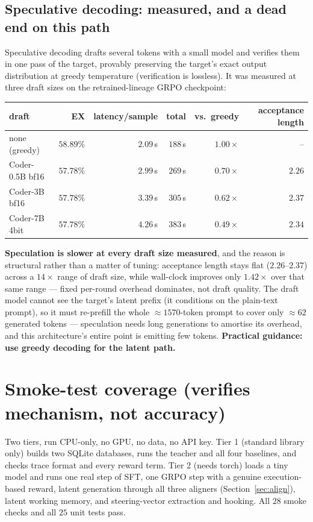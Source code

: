 \documentclass[11pt]{article}
\theoremstyle{definition}
\begin{document}
\subsection{Speculative decoding: measured, and a dead end on this path}

Speculative decoding drafts several tokens with a small model and verifies them in one pass of the target, provably preserving the target's exact output distribution at greedy temperature (verification is lossless). It was measured at three draft sizes on the retrained-lineage GRPO checkpoint:

\begin{center}
\begin{tabular}{lrrrrr}
\toprule
draft & EX & latency/sample & total & vs.\ greedy & acceptance length \\
\midrule
none (greedy) & $58.89\%$ & $2.09$\,s & $188$\,s & $1.00\times$ & -- \\
Coder-0.5B bf16 & $57.78\%$ & $2.99$\,s & $269$\,s & $0.70\times$ & $2.26$ \\
Coder-3B bf16 & $57.78\%$ & $3.39$\,s & $305$\,s & $0.62\times$ & $2.37$ \\
Coder-7B 4bit & $57.78\%$ & $4.26$\,s & $383$\,s & $0.49\times$ & $2.34$ \\
\bottomrule
\end{tabular}
\end{center}

\textbf{Speculation is slower at every draft size measured}, and the reason is structural rather than a matter of tuning: acceptance length stays flat ($2.26$--$2.37$) across a $14\times$ range of draft size, while wall-clock improves only $1.42\times$ over that same range --- fixed per-round overhead dominates, not draft quality. The draft model cannot see the target's latent prefix (it conditions on the plain-text prompt), so it must re-prefill the whole $\approx1570$-token prompt to cover only $\approx62$ generated tokens --- speculation needs long generations to amortise its overhead, and this architecture's entire point is emitting few tokens. \textbf{Practical guidance: use greedy decoding for the latent path.}

\section{Smoke-test coverage (verifies mechanism, not accuracy)}

Two tiers, run CPU-only, no GPU, no data, no API key. Tier 1 (standard library only) builds two SQLite databases, runs the teacher and all four baselines, and checks trace format and every reward term. Tier 2 (needs torch) loads a tiny model and runs one real step of SFT, one GRPO step with a genuine execution-based reward, latent generation through all three aligners (Section~\ref{sec:align}), latent working memory, and steering-vector extraction and hooking. All $28$ smoke checks and all $25$ unit tests pass.
\end{document}
